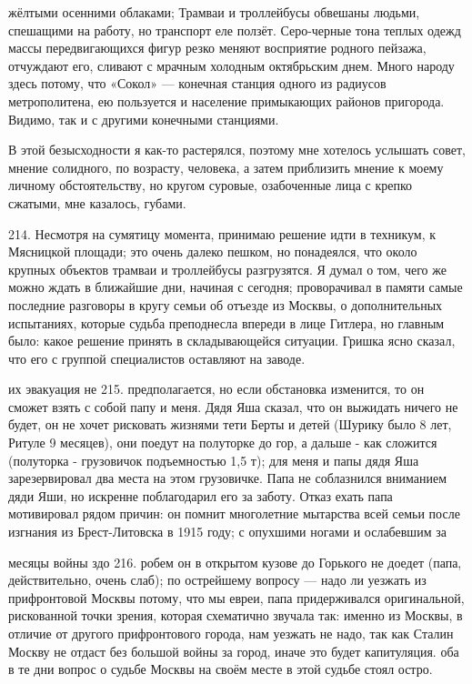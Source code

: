 жёлтыми осенними облаками; Трамваи и троллейбусы обвешаны людьми, спешащими на работу, но транспорт еле ползёт. Серо-черные тона теплых одежд массы передвигающихся фигур резко меняют восприятие родного пейзажа, отчуждают его, сливают с мрачным холодным октябрьским днем. Много народу здесь потому, что «Сокол» — конечная станция одного из радиусов метрополитена, ею пользуется и население примыкающих районов пригорода. Видимо, так и с другими конечными станциями.

В этой безысходности я как-то растерялся, поэтому мне хотелось услышать совет, мнение солидного, по возрасту, человека, а затем приблизить мнение к моему личному обстоятельству, но кругом суровые, озабоченные лица с крепко сжатыми, мне казалось, губами.

214. Несмотря на сумятицу момента, принимаю решение идти в техникум, к Мясницкой площади; это очень далеко пешком, но понадеялся, что около крупных объектов трамваи и троллейбусы разгрузятся. Я думал о том, чего же можно ждать в ближайшие дни, начиная с сегодня; проворачивал в памяти самые последние разговоры в кругу семьи об отъезде из Москвы, о дополнительных испытаниях, которые судьба преподнесла впереди в лице Гитлера, но главным было: какое решение принять в складывающейся ситуации. Гришка ясно сказал, что его с группой специалистов оставляют на заводе.

их эвакуация не 215. предполагается, но если обстановка изменится, то он сможет взять с собой папу и меня. Дядя Яша сказал, что он выжидать ничего не будет, он не хочет рисковать жизнями тети Берты и детей (Шурику было 8 лет, Ритуле 9 месяцев), они поедут на полуторке до гор, а дальше - как сложится (полуторка - грузовичок подъемностью 1,5 т); для меня и папы дядя Яша зарезервировал два места на этом грузовичке. Папа не соблазнился вниманием дяди Яши, но искренне поблагодарил его за заботу. Отказ ехать папа мотивировал рядом причин: он помнит многолетние мытарства всей семьи после изгнания из Брест-Литовска в 1915 году; с опухшими ногами и ослабевшим за

месяцы войны здо 216. робем он в открытом кузове до Горького не доедет (папа, действительно, очень слаб); по острейшему вопросу — надо ли уезжать из прифронтовой Москвы потому, что мы евреи, папа придерживался оригинальной, рискованной точки зрения, которая схематично звучала так: именно из Москвы, в отличие от другого прифронтового города, нам уезжать не надо, так как Сталин Москву не отдаст без большой войны за город, иначе это будет капитуляция. оба в те дни вопрос о судьбе Москвы на своём месте в этой судьбе стоял остро.

